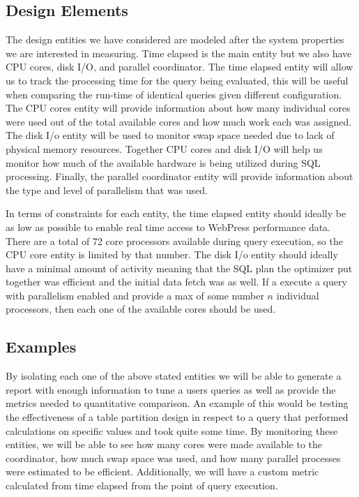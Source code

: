 \documentclass[draftclsnofoot, onecolumn, compsoc, 10pt]{IEEEtran}
\begin{document}
\subsection{Design Elements}
The design entities we have considered are modeled after the system properties we are interested in measuring.
Time elapsed is the main entity but we also have CPU cores, disk I/O, and parallel coordinator.
The time elapsed entity will allow us to track the processing time for the query being evaluated, this will be useful when comparing the run-time of identical queries given different configuration.
The CPU cores entity will provide information about how many individual cores were used out of the total available cores and how much work each was assigned.
The disk I/o entity will be used to monitor swap space needed due to lack of physical memory resources.
Together CPU cores and disk I/O will help us monitor how much of the available hardware is being utilized during SQL processing.
Finally, the parallel coordinator entity will provide information about the type and level of parallelism that was used.

In terms of constraints for each entity, the time elapsed entity should ideally be as low as possible to enable real time access to WebPress performance data.
There are a total of 72 core processors available during query execution, so the CPU core entity is limited by that number.
The disk I/o entity should ideally have a minimal amount of activity meaning that the SQL plan the optimizer put together was efficient and the initial data fetch was as well.
If a execute a query with parallelism enabled and provide a max of some number $n$ individual processors, then each one of the available cores should be used.

\subsection{Examples}
By isolating each one of the above stated entities we will be able to generate a report with enough information to tune a users queries as well as provide the metrics needed to quantitative comparison.
An example of this would be testing the effectiveness of a table partition design in respect to a query that performed calculations on specific values and took quite some time.
By monitoring these entities, we will be able to see how many cores were made available to the coordinator, how much swap space was used, and how many parallel processes were estimated to be efficient.
Additionally, we will have a custom metric calculated from time elapsed from the point of query execution.
\end{document}
